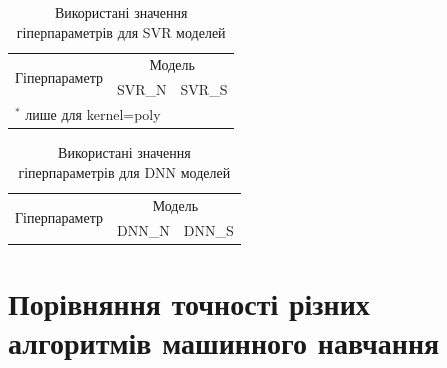 \documentclass[10pt,a5paper,titlepage,oneside]{book}
\numberwithin{equation}{part}
\begin{document}
\begin{table}[!ht]
\caption{Використані значення гіперпараметрів для SVR моделей}
\label{tblSVRrez}
\centering
\begin{tabular}{|l|c|c|}
\hline
\multirow{2}{*}{Гіперпараметр} & \multicolumn{2}{c|}{Модель} \\
\cline{2-3}
&SVR\_N&SVR\_S \rule{0pt}{11pt}\\
\hline
\hline
\multicolumn{2}{l}{$^*$ лише для kernel=poly}\\
\end{tabular}
\end{table}

\begin{table}[!ht]
\caption{Використані значення гіперпараметрів для DNN моделей}
\label{tblDNNrez}
\centering
\begin{tabular}{|l|c|c|}
\hline
\multirow{2}{*}{Гіперпараметр} & \multicolumn{2}{c|}{Модель} \\
\cline{2-3}
&DNN\_N&DNN\_S \rule{0pt}{11pt}\\
\hline
\hline
\end{tabular}
\end{table}



\section{Порівняння точності різних алгоритмів машинного навчання}
\end{document}
